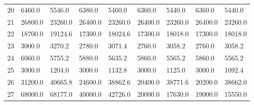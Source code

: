 \begin{tabular}{|r|l|l|l|l|l|l|l|l|}
  20 & 6460.0 & 5546.0 & 6380.0 & 5460.0 & 6360.0 & 5440.0 & 6360.0 & 5440.0 \\ 
  21 & 26800.0 & 23260.0 & 26400.0 & 23260.0 & 26400.0 & 23260.0 & 26400.0 & 23260.0 \\ 
  22 & 18700.0 & 19124.6 & 17300.0 & 18024.6 & 17300.0 & 18018.0 & 17300.0 & 18018.0 \\ 
  23 & 3000.0 & 3270.2 & 2780.0 & 3071.4 & 2760.0 & 3058.2 & 2760.0 & 3058.2 \\ 
  24 & 6060.0 & 5755.2 & 5880.0 & 5635.2 & 5860.0 & 5565.2 & 5860.0 & 5565.2 \\ 
  25 & 3000.0 & 1204.0 & 3000.0 & 1132.8 & 3000.0 & 1125.0 & 3000.0 & 1092.4 \\ 
  26 & 31200.0 & 40665.8 & 24600.0 & 38862.6 & 20400.0 & 38771.6 & 20200.0 & 38662.0 \\ 
  27 & 68000.0 & 68177.0 & 40000.0 & 42726.0 & 20000.0 & 17630.0 & 19000.0 & 15550.0 \\ 
\end{tabular}
